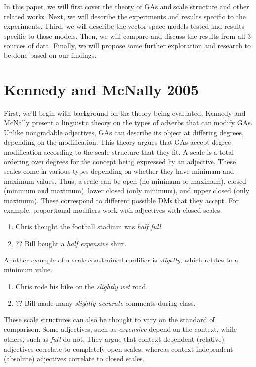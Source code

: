 \documentclass[11pt]{article}
\begin{document}
In this paper, we will first cover the theory of GAs and scale structure and other related works. Next, we will describe the experiments and results specific to the experiments. Third, we will describe the vector-space models tested and results specific to those models. Then, we will compare and discuss the results from all 3 sources of data. Finally, we will propose some further exploration and research to be done based on our findings.

\section{Kennedy and McNally 2005}

First, we'll begin with background on the theory being evaluated. Kennedy and McNally  present a linguistic theory on the types of adverbs that can modify GAs. Unlike nongradable adjectives, GAs can describe its object at differing degrees, depending on the modification. This theory argues that GAs accept degree modification according to the scale structure that they fit.  A scale is a total ordering over degrees for the concept being expressed by an adjective. These scales come in various types depending on whether they have minimum and maximum values. Thus, a scale can be open (no minimum or maximum), closed (minimum and maximum), lower closed (only minimum), and upper closed (only maximum). These correspond to different possible DMs that they accept. For example, proportional modifiers work with adjectives with closed scales.

\begin{enumerate}
\item Chris thought the football stadium was \textit{half full}.
\item ?? Bill bought a \textit{half expensive} shirt.
\end{enumerate}

Another example of a scale-constrained modifier is \textit{slightly}, which relates to a minimum value.

\begin{enumerate}
\item Chris rode his bike on the \textit{slightly wet} road.
\item ?? Bill made many \textit{slightly accurate} comments during class.
\end{enumerate}

These scale structures can also be thought to vary on the standard of comparison. Some adjectives, such as \textit{expensive} depend on the context, while others, such as \textit{full} do not. They argue that context-dependent (relative) adjectives correlate to completely open scales, whereas context-independent (absolute) adjectives correlate to closed scales. 
\end{document}
